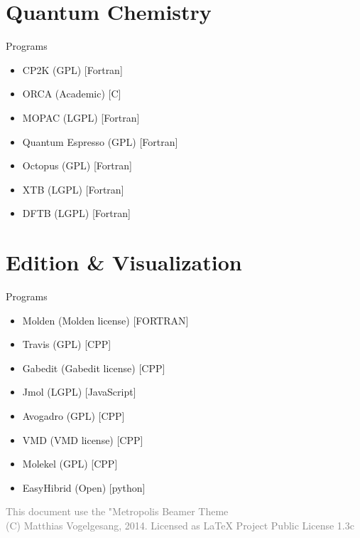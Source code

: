 \documentclass[10pt]{beamer}
\begin{document}
\section[Quantum]{Quantum Chemistry}

\begin{frame}[fragile]{Programs}
  \begin{itemize}
      \item CP2K (GPL) [Fortran]
      \item ORCA (Academic) [C]
      \item MOPAC (LGPL) [Fortran]
      \item Quantum Espresso (GPL) [Fortran]
      \item Octopus (GPL) [Fortran]
      \item XTB (LGPL) [Fortran]
      \item DFTB (LGPL) [Fortran]
  \end{itemize}
\end{frame}


\section[Edit]{Edition \& Visualization}

\begin{frame}[fragile]{Programs}
  \begin{itemize}
      \item Molden (Molden license) [FORTRAN]
      \item Travis (GPL) [CPP]
      \item Gabedit (Gabedit license) [CPP]
      \item Jmol (LGPL) [JavaScript]
      \item Avogadro (GPL) [CPP]
      \item VMD (VMD license) [CPP]
      \item Molekel (GPL) [CPP]
      \item EasyHibrid (Open) [python]
  \end{itemize}
\end{frame}

\begin{frame}
    \textcolor{gray}{This document use the "Metropolis Beamer Theme\\
    (C) Matthias Vogelgesang, 2014. Licensed as LaTeX Project Public License 1.3c }
\end{frame}
\end{document}
